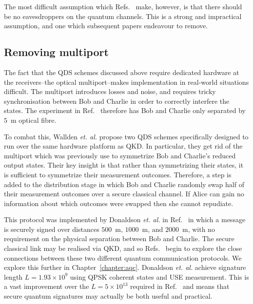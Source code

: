 The most difficult assumption which Refs.~\cite{Clarke2012, Dunjko2014, Collins2014} make, however, is that there should be no eavesdroppers on the quantum channels. This is a strong and impractical assumption, and one which subsequent papers endeavour to remove.


\subsection{Removing multiport}

The fact that the QDS schemes discussed above require dedicated hardware at the receivers--the optical multiport--makes implementation in real-world situations difficult. The multiport introduces losses and noise, and requires tricky synchronisation between Bob and Charlie in order to correctly interfere the states. The experiment in Ref.~\cite{Collins2014} therefore has Bob and Charlie only separated by $5$~m optical fibre. 

To combat this, Wallden \emph{et. al.} \cite{Wallden2015} propose two QDS schemes specifically designed to run over the same hardware platform as QKD. In particular, they get rid of the multiport which was previously use to symmetrize Bob and Charlie's reduced output states. Their key insight is that rather than symmetrizing their states, it is sufficient to symmetrize their measurement outcomes. Therefore, a step is added to the distribution stage in which Bob and Charlie randomly swap half of their measurement outcomes over a secure classical channel. If Alice can gain no information about which outcomes were swapped then she cannot repudiate. 

This protocol was implemented by Donaldson \emph{et. al.} in Ref.~\cite{Donaldson2016} in which a message is securely signed over distances $500$~m, $1000$~m, and $2000$~m, with no requirement on the physical separation between Bob and Charlie. The secure classical link may be realised via QKD, and so Refs.~\cite{Wallden2015, Donaldson2016} begin to explore the close connections between these two different quantum communication protocols. We explore this further in Chapter~\ref{chapter:aqc}. Donaldson \emph{et. al.} achieve signature length $L = 1.93 \times 10^9$ using QPSK coherent states and USE measurement. This is a vast improvement over the $L = 5 \times 10^{13}$ required in Ref.~\cite{Collins2014} and means that secure quantum signatures may actually be both useful and practical. 

